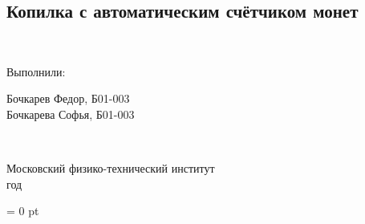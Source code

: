 \documentclass[a4paper,12pt]{extarticle}	%
\begin{document}
	\begin{titlepage}
	\begin{center}
	\vspace*{5cm}

	\section*{Копилка с автоматическим счётчиком монет}

	\begin{minipage}{0.3\textwidth}
	~
	\end{minipage}
	\hfill
	\begin{minipage}{0.2\textwidth}
		Выполнили:
	\end{minipage}
	\begin{minipage}{0.4\textwidth}
		Бочкарев Федор, Б01-003\\
		Бочкарева Софья, Б01-003
	\end{minipage}

	\begin{flushright}\textbf{\\}\end{flushright}

	\vfill

	Московский физико-технический институт\\
	\the\year{} год

	\end{center}
	\end{titlepage}

	\parindent=0cm
	\parskip=1pt
	\reversemarginpar
	\marginparpush = 0 pt

	
	
	
	
	
	
	
	
	
\end{document}
